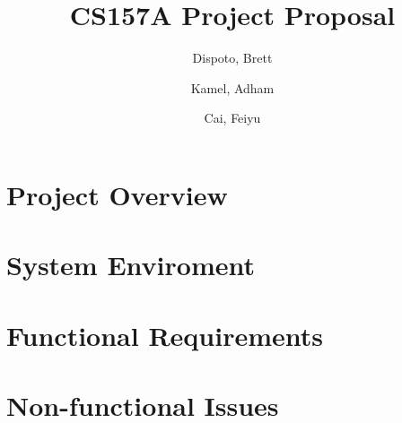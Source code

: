 \documentclass[titlepage]{article}
\author{ Dispoto, Brett\\
	\and
	Kamel, Adham\\
	\and
	Cai, Feiyu\\
}
\title{CS157A Project Proposal}
\begin{document}
	\maketitle
	
	\section{Project Overview}	
	



	\section{System Enviroment}


	
	\section{Functional Requirements}





	\section{Non-functional Issues}
\end{document}
